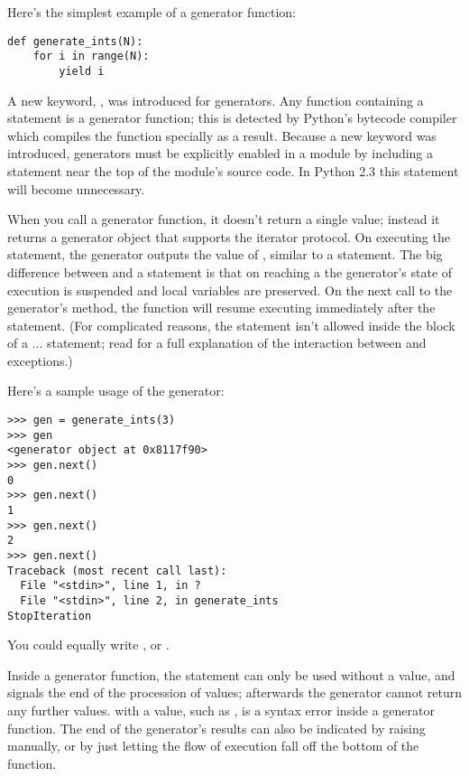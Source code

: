 \documentclass{howto}
\begin{document}
Here's the simplest example of a generator function:

\begin{verbatim}
def generate_ints(N):
    for i in range(N):
        yield i
\end{verbatim}

A new keyword, , was introduced for generators.  Any
function containing a  statement is a generator
function; this is detected by Python's bytecode compiler which
compiles the function specially as a result.  Because a new keyword was
introduced, generators must be explicitly enabled in a module by
including a  statement near
the top of the module's source code.  In Python 2.3 this statement
will become unnecessary.

When you call a generator function, it doesn't return a single value;
instead it returns a generator object that supports the iterator
protocol.  On executing the  statement, the generator
outputs the value of , similar to a 
statement.  The big difference between  and a
 statement is that on reaching a  the
generator's state of execution is suspended and local variables are
preserved.  On the next call to the generator's  method,
the function will resume executing immediately after the
 statement.  (For complicated reasons, the
 statement isn't allowed inside the  block
of a ... statement; read  for a full
explanation of the interaction between  and
exceptions.)

Here's a sample usage of the  generator:

\begin{verbatim}
>>> gen = generate_ints(3)
>>> gen
<generator object at 0x8117f90>
>>> gen.next()
0
>>> gen.next()
1
>>> gen.next()
2
>>> gen.next()
Traceback (most recent call last):
  File "<stdin>", line 1, in ?
  File "<stdin>", line 2, in generate_ints
StopIteration
\end{verbatim}

You could equally write , or
.

Inside a generator function, the  statement can only
be used without a value, and signals the end of the procession of
values; afterwards the generator cannot return any further values.
 with a value, such as , is a syntax
error inside a generator function.  The end of the generator's results
can also be indicated by raising  manually,
or by just letting the flow of execution fall off the bottom of the
function.
\end{document}

